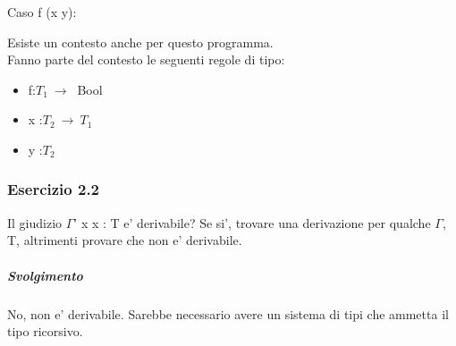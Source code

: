 Caso f (x y):\\
 	\begin{prooftree} 
	\end{prooftree} 
	
	Esiste un contesto anche per questo programma. \\
	Fanno parte del contesto le seguenti regole di tipo:
\begin{itemize}
	\item f:$T_1\:\rightarrow\:$ Bool
	\item x :$T_2\:\rightarrow\:T_1$
	\item y :$T_2$
\end{itemize}


\subsubsection*{Esercizio 2.2}
Il giudizio $\Gamma$' x x : T e' derivabile? Se si', trovare una derivazione per qualche $\Gamma$, T, altrimenti provare che non e' derivabile.

\subparagraph{Svolgimento}
 	\begin{prooftree} 
	\end{prooftree} 

No, non e' derivabile. Sarebbe necessario avere un sistema di tipi che ammetta il tipo ricorsivo. \\


